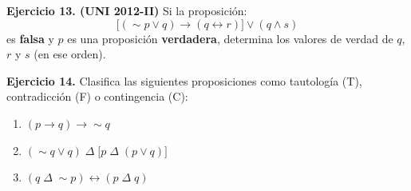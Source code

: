 \documentclass[12pt,a4paper]{article}
\newcommand{\espacioresp}[1][3cm]{\vspace{#1}}
\begin{document}
\espacioresp[6cm]

\begin{ejerciciobox}
\textbf{Ejercicio 13. \small(UNI 2012-II)}
Si la proposición:
\[
\bigl[(\sim p \vee q) \rightarrow (q \leftrightarrow r)\bigr] \vee (q \wedge s)
\]
es \textbf{falsa} y $p$ es una proposición \textbf{verdadera}, determina los valores de
verdad de $q$, $r$ y $s$ (en ese orden).
\end{ejerciciobox}

\espacioresp[5cm]

\begin{ejerciciobox}
\textbf{Ejercicio 14.}
Clasifica las siguientes proposiciones como tautología (T), contradicción (F)
o contingencia (C):
\begin{enumerate}[label=\Roman*.]
  \item $(p \rightarrow q) \rightarrow \sim q$
  \item $(\sim q \vee q) \;\Delta\; \bigl[p \;\Delta\; (p \vee q)\bigr]$
  \item $(q \;\Delta\; \sim p) \leftrightarrow (p \;\Delta\; q)$
\end{enumerate}
\end{ejerciciobox}

\espacioresp[5cm]
\end{document}
